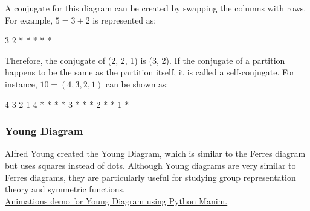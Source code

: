 \documentclass{article}
\begin{document}
\noindent A conjugate for this diagram can be created by swapping the columns with rows. For example, \(5=3+2\) is represented as:

\begin{center}
\begin{verbbox}
3 2
* *
* *
*
\\
\end{verbbox}
\theverbbox
\end{center}
\noindent Therefore, the conjugate of (2, 2, 1) is (3, 2).
\newline
\newline
If the conjugate of a partition happens to be the same as the partition itself, it is called a self-conjugate. For instance, \(10=(4, 3, 2, 1)\) can be shown as:
\begin{center}
\begin{verbbox}
  4 3 2 1
4 * * * *
3 * * * 
2 * *
1 *
\\
\end{verbbox}
\theverbbox
\end{center}

\subsubsection{Young Diagram}
Alfred Young created the Young Diagram, which is similar to the Ferres diagram but uses squares instead of dots. Although Young diagrams are very similar to Ferres diagrams, they are particularly useful for studying group representation theory and symmetric functions. \\

\noindent \href{https://youtu.be/8qc71j8yhG0}{Animations demo for Young Diagram using Python Manim.}\cite{manim}


\begin{figure}[h]
\centering
{}
\end{figure}
\end{document}
